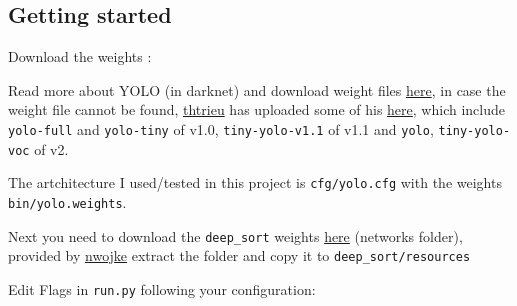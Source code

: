 \documentclass[letterpaper, 9pt, onecolumn, twoside, technote, final]{IEEEtran}
\begin{document}
\subsection{Getting started}
\label{sec:org41a996b}
Download the weights :

Read more about YOLO (in darknet) and download weight files \href{http://pjreddie.com/darknet/yolo/}{here}, in
case the weight file cannot be found, \href{https://github.com/thtrieu}{thtrieu} has uploaded some of his
\href{https://drive.google.com/drive/folders/0B1tW\_VtY7onidEwyQ2FtQVplWEU}{here}, which include \texttt{yolo-full} and \texttt{yolo-tiny} of v1.0,
\texttt{tiny-yolo-v1.1} of v1.1 and \texttt{yolo}, \texttt{tiny-yolo-voc} of v2.

The artchitecture I used/tested in this project is \texttt{cfg/yolo.cfg} with
the weights \texttt{bin/yolo.weights}.

Next you need to download the \texttt{deep\_sort} weights \href{https://owncloud.uni-koblenz.de/owncloud/s/f9JB0Jr7f3zzqs8?path=\%2Fresources}{here} (networks
folder), provided by \href{https://github.com/nwojke}{nwojke} extract the folder and copy it to
\texttt{deep\_sort/resources}

Edit Flags in \texttt{run.py} following your configuration:
\end{document}
